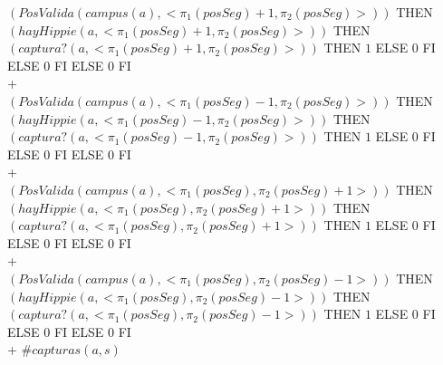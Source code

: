 \documentclass[10pt, a4paper]{article}
\begin{document}
\begin{tad}{}
{    {\IF $(PosValida(campus(a),<\pi_1(posSeg)+1,\pi_2(posSeg)>))$ THEN
    {\IF $(hayHippie(a,<\pi_1(posSeg)+1,\pi_2(posSeg)>))$ THEN
    {\IF $(captura?(a,<\pi_1(posSeg)+1,\pi_2(posSeg)>))$ THEN $1$ ELSE $0$ FI}
    ELSE $0$ FI}
    ELSE $0$ FI}\\
    +\\
    {\IF $(PosValida(campus(a),<\pi_1(posSeg)-1,\pi_2(posSeg)>))$ THEN
    {\IF $(hayHippie(a,<\pi_1(posSeg)-1,\pi_2(posSeg)>))$ THEN
    {\IF $(captura?(a,<\pi_1(posSeg)-1,\pi_2(posSeg)>))$ THEN $1$ ELSE $0$ FI}
    ELSE $0$ FI}
    ELSE $0$ FI}\\
    +\\
    {\IF $(PosValida(campus(a),<\pi_1(posSeg),\pi_2(posSeg)+1>))$ THEN
    {\IF $(hayHippie(a,<\pi_1(posSeg),\pi_2(posSeg)+1>))$ THEN
    {\IF $(captura?(a,<\pi_1(posSeg),\pi_2(posSeg)+1>))$ THEN $1$ ELSE $0$ FI}
    ELSE $0$ FI}
    ELSE $0$ FI}\\
    +\\
    {\IF $(PosValida(campus(a),<\pi_1(posSeg),\pi_2(posSeg)-1>))$ THEN
    {\IF $(hayHippie(a,<\pi_1(posSeg),\pi_2(posSeg)-1>))$ THEN
    {\IF $(captura?(a,<\pi_1(posSeg),\pi_2(posSeg)-1>))$ THEN $1$ ELSE $0$ FI}
    ELSE $0$ FI}
    ELSE $0$ FI}\\
    + $\#capturas(a,s)$
}






\end{tad}
\end{document}
